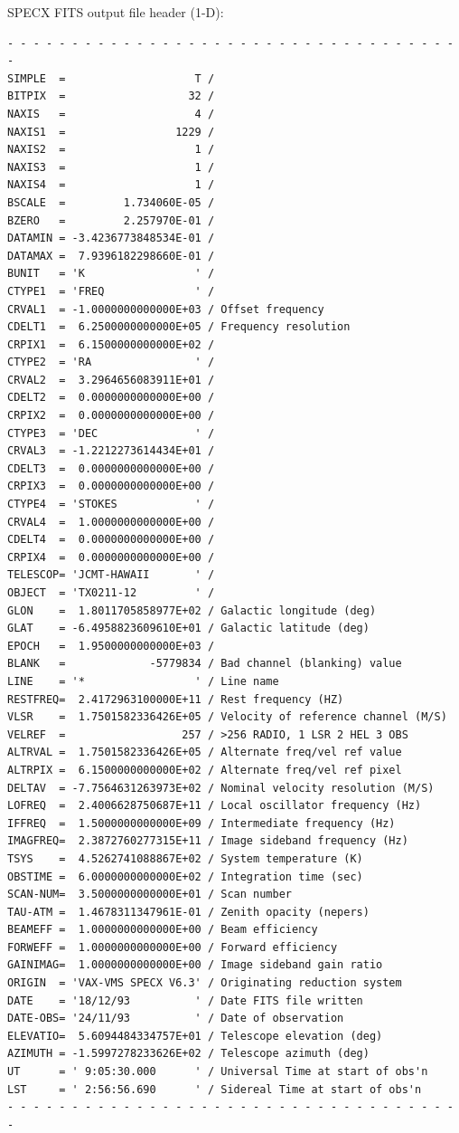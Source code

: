 \documentclass[11pt,twoside]{report}
\begin{document}
SPECX FITS output file header (1-D):
\begin{verbatim}
- - - - - - - - - - - - - - - - - - - - - - - - - - - - - - - - - - - -
SIMPLE  =                    T /
BITPIX  =                   32 /
NAXIS   =                    4 /
NAXIS1  =                 1229 /
NAXIS2  =                    1 /
NAXIS3  =                    1 /
NAXIS4  =                    1 /
BSCALE  =         1.734060E-05 /
BZERO   =         2.257970E-01 /
DATAMIN = -3.4236773848534E-01 /
DATAMAX =  7.9396182298660E-01 /
BUNIT   = 'K                 ' /
CTYPE1  = 'FREQ              ' /
CRVAL1  = -1.0000000000000E+03 / Offset frequency
CDELT1  =  6.2500000000000E+05 / Frequency resolution
CRPIX1  =  6.1500000000000E+02 /
CTYPE2  = 'RA                ' /
CRVAL2  =  3.2964656083911E+01 /
CDELT2  =  0.0000000000000E+00 /
CRPIX2  =  0.0000000000000E+00 /
CTYPE3  = 'DEC               ' /
CRVAL3  = -1.2212273614434E+01 /
CDELT3  =  0.0000000000000E+00 /
CRPIX3  =  0.0000000000000E+00 /
CTYPE4  = 'STOKES            ' /
CRVAL4  =  1.0000000000000E+00 /
CDELT4  =  0.0000000000000E+00 /
CRPIX4  =  0.0000000000000E+00 /
TELESCOP= 'JCMT-HAWAII       ' /
OBJECT  = 'TX0211-12         ' /
GLON    =  1.8011705858977E+02 / Galactic longitude (deg)
GLAT    = -6.4958823609610E+01 / Galactic latitude (deg)
EPOCH   =  1.9500000000000E+03 /
BLANK   =             -5779834 / Bad channel (blanking) value
LINE    = '*                 ' / Line name
RESTFREQ=  2.4172963100000E+11 / Rest frequency (HZ)
VLSR    =  1.7501582336426E+05 / Velocity of reference channel (M/S)
VELREF  =                  257 / >256 RADIO, 1 LSR 2 HEL 3 OBS
ALTRVAL =  1.7501582336426E+05 / Alternate freq/vel ref value
ALTRPIX =  6.1500000000000E+02 / Alternate freq/vel ref pixel
DELTAV  = -7.7564631263973E+02 / Nominal velocity resolution (M/S)
LOFREQ  =  2.4006628750687E+11 / Local oscillator frequency (Hz)
IFFREQ  =  1.5000000000000E+09 / Intermediate frequency (Hz)
IMAGFREQ=  2.3872760277315E+11 / Image sideband frequency (Hz)
TSYS    =  4.5262741088867E+02 / System temperature (K)
OBSTIME =  6.0000000000000E+02 / Integration time (sec)
SCAN-NUM=  3.5000000000000E+01 / Scan number
TAU-ATM =  1.4678311347961E-01 / Zenith opacity (nepers)
BEAMEFF =  1.0000000000000E+00 / Beam efficiency
FORWEFF =  1.0000000000000E+00 / Forward efficiency
GAINIMAG=  1.0000000000000E+00 / Image sideband gain ratio
ORIGIN  = 'VAX-VMS SPECX V6.3' / Originating reduction system
DATE    = '18/12/93          ' / Date FITS file written
DATE-OBS= '24/11/93          ' / Date of observation
ELEVATIO=  5.6094484334757E+01 / Telescope elevation (deg)
AZIMUTH = -1.5997278233626E+02 / Telescope azimuth (deg)
UT      = ' 9:05:30.000      ' / Universal Time at start of obs'n
LST     = ' 2:56:56.690      ' / Sidereal Time at start of obs'n
- - - - - - - - - - - - - - - - - - - - - - - - - - - - - - - - - - - -
\end{verbatim}
\end{document}
